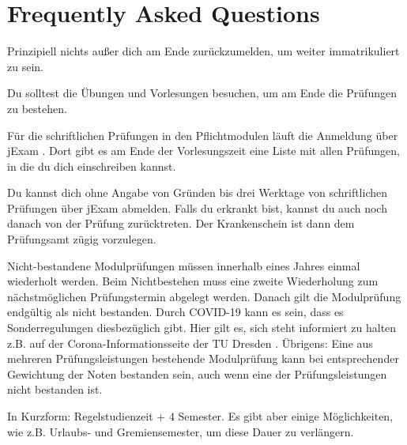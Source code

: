\newcommand{\fancypageref}[1] {%
    \changemenucolor{gray}{br}{named}{ese_bg_color}%
    \changemenucolor{gray}{txt}{named}{ese_bg_color}%
    \keys{Seite \pageref{#1}}%
    \changemenucolor{gray}{br}{named}{ese_bg_color}%
    \changemenucolor{gray}{txt}{named}{ese_bg_color}%
}

\chapter*{Frequently Asked Questions}
\label{sec:faq}
Prinzipiell nichts außer dich am Ende zurückzumelden, um weiter immatrikuliert zu sein.

Du solltest die Übungen und Vorlesungen besuchen, um am Ende die Prüfungen zu bestehen.

Für die schriftlichen Prüfungen in den Pflichtmodulen läuft die Anmeldung über jExam .
Dort gibt es am Ende der Vorlesungszeit eine Liste mit allen Prüfungen, in die du dich einschreiben kannst.

Du kannst dich ohne Angabe von Gründen bis drei Werktage von schriftlichen Prüfungen über jExam abmelden. Falls du erkrankt bist, kannst du auch noch danach von der Prüfung zurücktreten. Der Krankenschein ist dann dem Prüfungsamt zügig vorzulegen.

Nicht-bestandene Modulprüfungen müssen innerhalb eines Jahres einmal wiederholt werden. Beim Nichtbestehen muss eine zweite Wiederholung zum nächstmöglichen Prüfungstermin abgelegt werden. Danach gilt die Modulprüfung endgültig als nicht bestanden. 
Durch COVID-19 kann es sein, dass es Sonderregulungen diesbezüglich gibt. Hier gilt es, sich steht informiert zu halten z.B. auf der Corona-Informationsseite der TU Dresden . 
Übrigens: Eine aus mehreren Prüfungsleistungen bestehende Modulprüfung kann bei entsprechender Gewichtung der Noten bestanden sein, auch wenn eine der Prüfungsleistungen nicht bestanden ist.

In Kurzform: Regelstudienzeit + 4 Semester. Es gibt aber einige Möglichkeiten, wie z.B. Urlaubs- und Gremiensemester, um diese Dauer zu verlängern.

